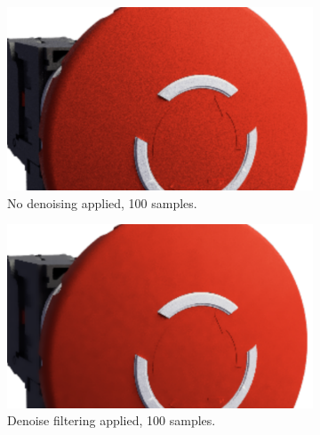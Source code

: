 \begin{figure}[H]
    \centering
    \hspace*{0.8cm}
    \begin{subfigure}[t]{0.38\textwidth}
        \includegraphics[width=\textwidth]{resources/denoise-off-100-samples.png}
        \caption{No denoising applied, 100 samples.}
        \label{fig:denoise-off}
    \end{subfigure}
    \hfill
    \begin{subfigure}[t]{0.38\textwidth}
        \includegraphics[width=\textwidth]{resources/denoise-gaussian-100-samples.png}
        \caption{Denoise filtering applied, 100 samples.}
        \label{fig:denoise-gaussian-100-samples}
    \end{subfigure}
    \hspace*{0.8cm}
    \vfill
    \vspace*{0.5cm}
    \hspace*{0.8cm}
    \begin{subfigure}[t]{0.38\textwidth}

\end{subfigure}
\end{figure}
